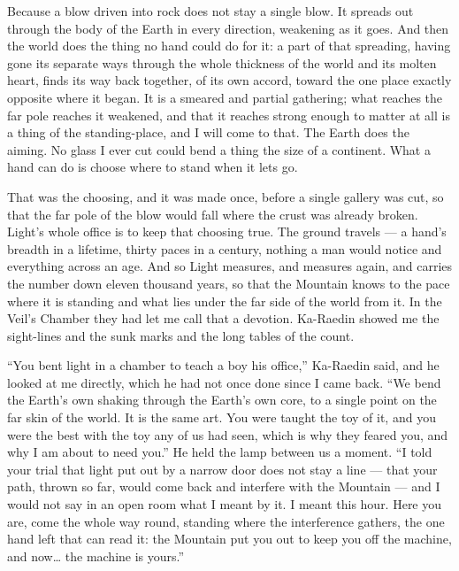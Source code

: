 Because a blow driven into rock does not stay a single blow. It spreads out through the body of the Earth in every direction, weakening as it goes. And then the world does the thing no hand could do for it: a part of that spreading, having gone its separate ways through the whole thickness of the world and its molten heart, finds its way back together, of its own accord, toward the one place exactly opposite where it began. It is a smeared and partial gathering; what reaches the far pole reaches it weakened, and that it reaches strong enough to matter at all is a thing of the standing-place, and I will come to that. The Earth does the aiming. No glass I ever cut could bend a thing the size of a continent. What a hand can do is choose where to stand when it lets go.\par

That was the choosing, and it was made once, before a single gallery was cut, so that the far pole of the blow would fall where the crust was already broken. Light's whole office is to keep that choosing true. The ground travels --- a hand's breadth in a lifetime, thirty paces in a century, nothing a man would notice and everything across an age. And so Light measures, and measures again, and carries the number down eleven thousand years, so that the Mountain knows to the pace where it is standing and what lies under the far side of the world from it. In the Veil's Chamber they had let me call that a devotion. Ka-Raedin showed me the sight-lines and the sunk marks and the long tables of the count.\par

``You bent light in a chamber to teach a boy his office,'' Ka-Raedin said, and he looked at me directly, which he had not once done since I came back. ``We bend the Earth's own shaking through the Earth's own core, to a single point on the far skin of the world. It is the same art. You were taught the toy of it, and you were the best with the toy any of us had seen, which is why they feared you, and why I am about to need you.'' He held the lamp between us a moment. ``I told your trial that light put out by a narrow door does not stay a line --- that your path, thrown so far, would come back and interfere with the Mountain --- and I would not say in an open room what I meant by it. I meant this hour. Here you are, come the whole way round, standing where the interference gathers, the one hand left that can read it: the Mountain put you out to keep you off the machine, and now\ldots{} the machine is yours.''\par

